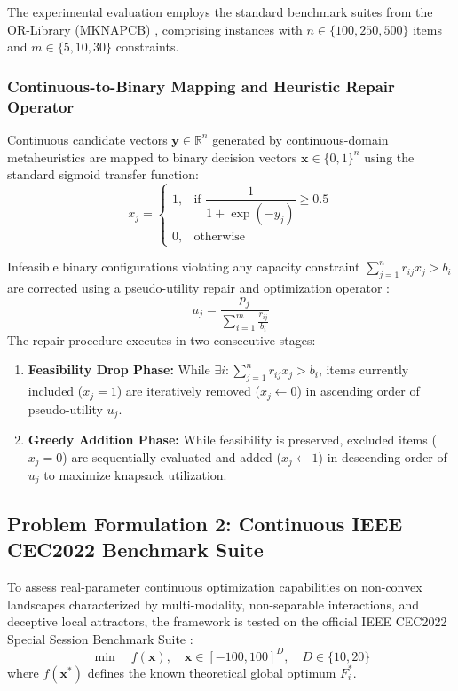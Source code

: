 The experimental evaluation employs the standard benchmark suites from the OR-Library (MKNAPCB) \cite{chu1998genetic}, comprising instances with $n \in \{100, 250, 500\}$ items and $m \in \{5, 10, 30\}$ constraints.

\subsubsection{Continuous-to-Binary Mapping and Heuristic Repair Operator}

Continuous candidate vectors $\mathbf{y} \in \mathbb{R}^n$ generated by continuous-domain metaheuristics are mapped to binary decision vectors $\mathbf{x} \in \{0, 1\}^n$ using the standard sigmoid transfer function:
\begin{equation}
x_j = \begin{cases}
1, & \text{if } \dfrac{1}{1 + \exp(-y_j)} \ge 0.5 \\
0, & \text{otherwise}
\end{cases}
\label{eq:sigmoid_mapping}
\end{equation}

Infeasible binary configurations violating any capacity constraint $\sum_{j=1}^{n} r_{ij} x_j > b_i$ are corrected using a pseudo-utility repair and optimization operator \cite{chu1998genetic}:
\begin{equation}
u_j = \frac{p_j}{\displaystyle\sum_{i=1}^{m} \frac{r_{ij}}{b_i}}
\label{eq:pseudo_utility}
\end{equation}
The repair procedure executes in two consecutive stages:
\begin{enumerate}
    \item \textbf{Feasibility Drop Phase:} While $\exists i : \sum_{j=1}^n r_{ij} x_j > b_i$, items currently included ($x_j = 1$) are iteratively removed ($x_j \leftarrow 0$) in ascending order of pseudo-utility $u_j$.
    \item \textbf{Greedy Addition Phase:} While feasibility is preserved, excluded items ($x_j = 0$) are sequentially evaluated and added ($x_j \leftarrow 1$) in descending order of $u_j$ to maximize knapsack utilization.
\end{enumerate}

\subsection{Problem Formulation 2: Continuous IEEE CEC2022 Benchmark Suite}
\label{sec:cec2022_formulation}

To assess real-parameter continuous optimization capabilities on non-convex landscapes characterized by multi-modality, non-separable interactions, and deceptive local attractors, the framework is tested on the official IEEE CEC2022 Special Session Benchmark Suite \cite{kumar2022problem}:
\begin{equation}
\min \quad f(\mathbf{x}), \quad \mathbf{x} \in [-100, 100]^D, \quad D \in \{10, 20\}
\label{eq:cec_objective}
\end{equation}
where $f(\mathbf{x}^*)$ defines the known theoretical global optimum $F_i^*$.

